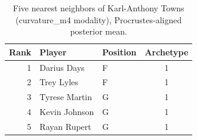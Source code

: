 \begin{table}[htbp]
  \centering\small
  \begin{tabular}{rllc}
    \toprule
    Rank & Player & Position & Archetype \\
    \midrule
    1 & Darius Days & F & 1 \\
    2 & Trey Lyles & F & 1 \\
    3 & Tyrese Martin & G & 1 \\
    4 & Kevin Johnson & G & 1 \\
    5 & Rayan Rupert & G & 1 \\
    \bottomrule
  \end{tabular}
  \caption{Five nearest neighbors of Karl-Anthony Towns (curvature_m4 modality), Procrustes-aligned posterior mean.}
  \label{tab:Karl_Anthony_Towns_neighbors_curvature_m4}
\end{table}

